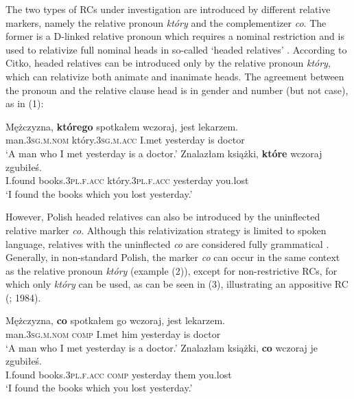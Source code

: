 \documentclass[output=paper]{langsci/langscibook}
\begin{document}
The two types of RCs under investigation are introduced by different relative markers, namely the relative pronoun \textit{który} and the complementizer \textit{co}. The former is a D-linked relative pronoun which requires a nominal restriction and is used to relativize full nominal heads in so-called ‘headed relatives’ \citep{Citko2004}. According to Citko, headed relatives can be introduced only by the relative pronoun \textit{który}, which can relativize both animate and inanimate heads. The agreement between the pronoun and the relative clause head is in gender and number (but not case), as in (1): 

\ea%
    \label{ex:leska:1}
    \ea
    \gll Mężczyzna, \textbf{którego} spotkałem wczoraj, jest lekarzem.\\
         man.\textsc{3sg.m.nom} który.\textsc{3sg.m.acc} I.met yesterday is doctor\\
    \glt ‘A man who I met yesterday is a doctor.’
\ex
    \gll Znalazłam   książki, \textbf{które}   wczoraj zgubiłeś. \\
         I.found books.\textsc{3pl.f.acc} który.\textsc{3pl.f.acc} yesterday you.lost\\
    \glt ‘I found the books which you lost yesterday.’
    \z
\z    

However, Polish headed relatives can also be introduced by the uninflected relative marker \textit{co}. Although this relativization strategy is limited to spoken language, relatives with the uninflected \textit{co} are considered fully grammatical \citep{ButtlerEtAl1971}. Generally, in non-standard Polish, the marker \textit{co} can occur in the same context as the relative pronoun \textit{który} (example (2)), except for non-restrictive RCs, for which only \textit{który} can be used, as can be seen in (3), illustrating an appositive RC (\citealt{Borsley1981}; 1984).

\ea%
    \label{ex:leska:2}
    \ea
    \gll Mężczyzna, \textbf{co} spotkałem go wczoraj, jest lekarzem.\\
         man.\textsc{3sg.m.nom comp} I.met him yesterday is doctor\\
    \glt ‘A man who I met yesterday is a doctor.’
    \ex
    \gll Znalazłam   książki, \textbf{co} wczoraj   je zgubiłeś. \\
         I.found books.\textsc{3pl.f.acc comp}\textsubscript{} yesterday them you.lost\\
    \glt ‘I found the books which you lost yesterday.’
    \z
\z    
\end{document}
